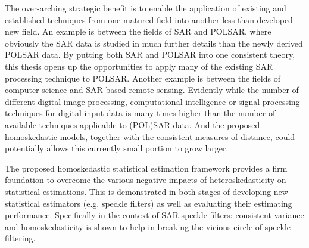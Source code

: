The over-arching strategic benefit is to enable the application of existing and established techniques from one matured field into another less-than-developed new field.
An example is between the fields of SAR and POLSAR, where obviously the SAR data is studied in much further details than the newly derived POLSAR data.
By putting both SAR and POLSAR into one consistent theory, this thesis opens up the opportunities to apply many of the existing SAR processing technique to POLSAR.
Another example is between the fields of computer science and SAR-based remote sensing.
Evidently while the number of different digital image processing, computational intelligence or signal processing techniques for digital input data is many times higher than the number of available techniques applicable to (POL)SAR data.
And the proposed homoskedastic models, together with the consistent measures of distance,  %
could potentially allows this currently small portion to grow larger.

The proposed homoskedastic statistical estimation framework provides a firm foundation
to overcome the various negative impacts of heteroskedasticity on statistical estimations.
This
                is demonstrated in both stages of developing new
                statistical estimators (e.g. speckle filters) as well as evaluating their estimating performance.
Specifically
                in the context of SAR speckle filters: consistent
                variance and homoskedasticity is shown to help in
                breaking the vicious circle of speckle filtering.

